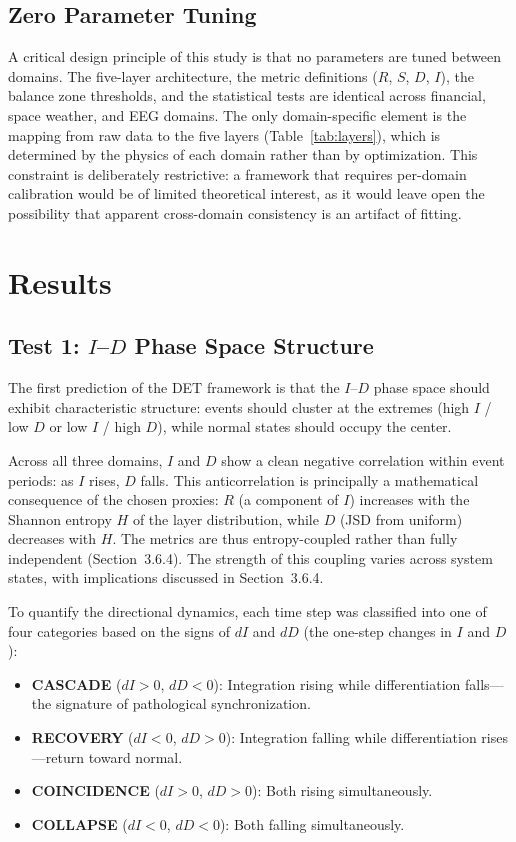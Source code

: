 \documentclass[aip,cha,reprint,amsmath,amssymb,final]{revtex4-2}
\begin{document}
\subsection{Zero Parameter Tuning}

A critical design principle of this study is that no parameters are tuned between domains. The five-layer architecture, the metric definitions ($R$, $S$, $D$, $I$), the balance zone thresholds, and the statistical tests are identical across financial, space weather, and EEG domains. The only domain-specific element is the mapping from raw data to the five layers (Table~\ref{tab:layers}), which is determined by the physics of each domain rather than by optimization. This constraint is deliberately restrictive: a framework that requires per-domain calibration would be of limited theoretical interest, as it would leave open the possibility that apparent cross-domain consistency is an artifact of fitting.


\section{Results}

\subsection{Test 1: $I$--$D$ Phase Space Structure}

The first prediction of the DET framework is that the $I$--$D$ phase space should exhibit characteristic structure: events should cluster at the extremes (high $I$ / low $D$ or low $I$ / high $D$), while normal states should occupy the center.

Across all three domains, $I$ and $D$ show a clean negative correlation within event periods: as $I$ rises, $D$ falls. This anticorrelation is principally a mathematical consequence of the chosen proxies: $R$ (a component of $I$) increases with the Shannon entropy $H$ of the layer distribution, while $D$ (JSD from uniform) decreases with $H$. The metrics are thus entropy-coupled rather than fully independent (Section~3.6.4). The strength of this coupling varies across system states, with implications discussed in Section~3.6.4.

To quantify the directional dynamics, each time step was classified into one of four categories based on the signs of $dI$ and $dD$ (the one-step changes in $I$ and $D$):

\begin{itemize}
\item \textbf{CASCADE} ($dI > 0$, $dD < 0$): Integration rising while differentiation falls---the signature of pathological synchronization.
\item \textbf{RECOVERY} ($dI < 0$, $dD > 0$): Integration falling while differentiation rises---return toward normal.
\item \textbf{COINCIDENCE} ($dI > 0$, $dD > 0$): Both rising simultaneously.
\item \textbf{COLLAPSE} ($dI < 0$, $dD < 0$): Both falling simultaneously.
\end{itemize}
\end{document}
